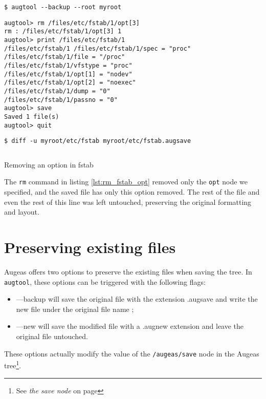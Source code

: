 \begin{listing}
  \begin{verbatim}
$ augtool --backup --root myroot
  \end{verbatim}
  \begin{verbatim}
augtool> rm /files/etc/fstab/1/opt[3]
rm : /files/etc/fstab/1/opt[3] 1
augtool> print /files/etc/fstab/1
/files/etc/fstab/1 /files/etc/fstab/1/spec = "proc"
/files/etc/fstab/1/file = "/proc"
/files/etc/fstab/1/vfstype = "proc"
/files/etc/fstab/1/opt[1] = "nodev"
/files/etc/fstab/1/opt[2] = "noexec"
/files/etc/fstab/1/dump = "0"
/files/etc/fstab/1/passno = "0"
augtool> save
Saved 1 file(s)
augtool> quit
  \end{verbatim}
  \begin{verbatim}
$ diff -u myroot/etc/fstab myroot/etc/fstab.augsave
  \end{verbatim}
  \inputminted{diff}{listings/fstab_opt.diff}
  \label{lst:rm_fstab_opt}
  \caption{Removing an option in fstab}
\end{listing}


The \verb!rm! command in listing \ref{lst:rm_fstab_opt} removed only the \verb!opt! node we specified, and the saved file has only this option removed. The rest of the file and even the rest of this line was left untouched, preserving the original formatting and layout.

\section{Preserving existing files}

  

Augeas offers two options to preserve the existing files when saving the tree. In \verb!augtool!, these options can be triggered with the following flags:

\begin{itemize}
\item
  ---backup will save the original file with the extension .augsave and write the new file under the original file name ;
\item
  ---new will save the modified file with a .augnew extension and leave the original file untouched.
\end{itemize}
These options actually modify the value of the \verb!/augeas/save! node in the Augeas tree\footnote{See \emph{the save node} on page \pageref{sec:save_node}}.

